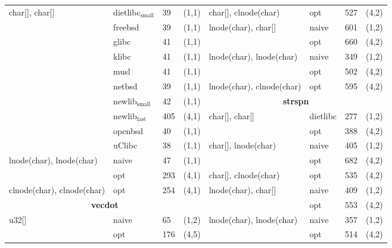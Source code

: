 \begin{figure}[t]
\begin{scriptsize}
\begin{tabular}{lllclllc}
char[], char[] & dietlibc$\mathrm{_{small}}$ & 39 & (1,1) &                 char[], clnode(char) & opt & 527 & (4,2) \\
       & freebsd & 39 & (1,1) &                                             lnode(char), char[] & naive & 601 & (1,2) \\
       & glibc & 41 & (1,1) &                                                                  & opt & 660 & (4,2) \\ 
       & klibc & 41 & (1,1) &                                               lnode(char), lnode(char) & naive & 349 & (1,2) \\
       & musl & 41 & (1,1) &                                                                        & opt & 502 & (4,2) \\
       & netbsd & 39 & (1,1) &                                              lnode(char), clnode(char) & opt & 595 & (4,2) \\
       & newlib$\mathrm{_{small}}$ & 42 & (1,1) &                              \multicolumn{4}{c}{\bf strspn} \\
       & newlib$\mathrm{_{fast}}$ & 405 & (4,1) &                              char[], char[] & dietlibc & 277 & (1,2)                   \\
       & openbsd & 40 & (1,1) &                                                              & opt      & 388 & (4,2)                    \\
       & uClibc & 38 & (1,1) &                                                 char[], lnode(char) & naive & 405 & (1,2)                 \\
lnode(char), lnode(char) & naive & 47 & (1,1) &                                                   & opt & 682 & (4,2)                    \\ 
            & opt & 293 & (4,1) &                                              char[], clnode(char) & opt & 535 & (4,2)                  \\
clnode(char), clnode(char) & opt & 254 & (4,1) &                               lnode(char), char[] & naive & 409 & (1,2)           \\
\multicolumn{4}{c}{\bf vecdot} &                                                          & opt & 553 & (4,2)              \\
u32[] & naive & 65 & (1,2) &                                                  lnode(char), lnode(char) & naive & 357 & (1,2)        \\
      & opt & 176 & (4,5)   &                                                                          & opt & 514 & (4,2)        \\

\end{tabular}
\end{scriptsize}
\end{figure}

